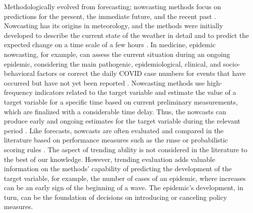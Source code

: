 Methodologically evolved from forecasting; nowcasting methods focus on predictions for the present, the immediate future, and the recent past \citep{banbura2013now}.
Nowcasting has its origins in meteorology, and the methods were initially developed to describe the current state of the weather in detail and to predict the expected change on a time scale of a few hours \citep{browning1989nowcasting,schmid2019nowcasting}. 
In medicine, epidemic nowcasting, for example, can assess the current situation during an ongoing epidemic, considering the main pathogenic, epidemiological, clinical, and socio-behavioral factors \citep{wu2021nowcasting} or correct the daily COVID case numbers for events that have occurred but have not yet been reported \citep{gunther2021nowcasting}. 
Nowcasting methods use high-frequency indicators related to the target variable and estimate the value of a target variable for a specific time based on current preliminary measurements, which are finalized with a considerable time delay. 
Thus, the nowcasts can produce early and ongoing estimates for the target variable during the relevant period \citep{castle2017forecasting}. 
Like forecasts, nowcasts are often evaluated and compared in the literature based on performance measures such as the \ac{rmse} \citep{gunther2021nowcasting} or probabilistic scoring rules \citep{Wolffram2023}. 
The aspect of trending ability is not considered in the literature to the best of our knowledge. 
However, trending evaluation adds valuable information on the methods' capability of predicting the development of the target variable, for example, the number of cases of an epidemic, where increases can be an early sign of the beginning of a wave.
The epidemic's development, in turn, can be the foundation of decisions on introducing or canceling policy measures. 

